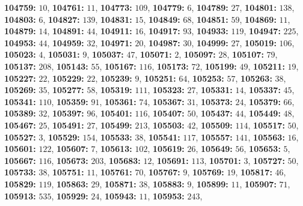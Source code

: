 \textsf{\bfseries 104759:} $10$, \textsf{\bfseries 104761:} $11$, \textsf{\bfseries 104773:} $109$, \textsf{\bfseries 104779:} $6$, \textsf{\bfseries 104789:} $27$, \textsf{\bfseries 104801:} $138$, \textsf{\bfseries 104803:} $6$, \textsf{\bfseries 104827:} $139$, \textsf{\bfseries 104831:} $15$, \textsf{\bfseries 104849:} $68$, \textsf{\bfseries 104851:} $59$, \textsf{\bfseries 104869:} $11$, \textsf{\bfseries 104879:} $14$, \textsf{\bfseries 104891:} $44$, \textsf{\bfseries 104911:} $16$, \textsf{\bfseries 104917:} $93$, \textsf{\bfseries 104933:} $119$, \textsf{\bfseries 104947:} $225$, \textsf{\bfseries 104953:} $44$, \textsf{\bfseries 104959:} $32$, \textsf{\bfseries 104971:} $20$, \textsf{\bfseries 104987:} $30$, \textsf{\bfseries 104999:} $27$, \textsf{\bfseries 105019:} $106$, \textsf{\bfseries 105023:} $4$, \textsf{\bfseries 105031:} $9$, \textsf{\bfseries 105037:} $47$, \textsf{\bfseries 105071:} $2$, \textsf{\bfseries 105097:} $28$, \textsf{\bfseries 105107:} $79$, \textsf{\bfseries 105137:} $208$, \textsf{\bfseries 105143:} $55$, \textsf{\bfseries 105167:} $116$, \textsf{\bfseries 105173:} $72$, \textsf{\bfseries 105199:} $49$, \textsf{\bfseries 105211:} $19$, \textsf{\bfseries 105227:} $22$, \textsf{\bfseries 105229:} $22$, \textsf{\bfseries 105239:} $9$, \textsf{\bfseries 105251:} $64$, \textsf{\bfseries 105253:} $57$, \textsf{\bfseries 105263:} $38$, \textsf{\bfseries 105269:} $35$, \textsf{\bfseries 105277:} $58$, \textsf{\bfseries 105319:} $111$, \textsf{\bfseries 105323:} $27$, \textsf{\bfseries 105331:} $14$, \textsf{\bfseries 105337:} $45$, \textsf{\bfseries 105341:} $110$, \textsf{\bfseries 105359:} $91$, \textsf{\bfseries 105361:} $74$, \textsf{\bfseries 105367:} $31$, \textsf{\bfseries 105373:} $24$, \textsf{\bfseries 105379:} $66$, \textsf{\bfseries 105389:} $32$, \textsf{\bfseries 105397:} $96$, \textsf{\bfseries 105401:} $116$, \textsf{\bfseries 105407:} $50$, \textsf{\bfseries 105437:} $44$, \textsf{\bfseries 105449:} $48$, \textsf{\bfseries 105467:} $25$, \textsf{\bfseries 105491:} $27$, \textsf{\bfseries 105499:} $213$, \textsf{\bfseries 105503:} $42$, \textsf{\bfseries 105509:} $114$, \textsf{\bfseries 105517:} $50$, \textsf{\bfseries 105527:} $3$, \textsf{\bfseries 105529:} $154$, \textsf{\bfseries 105533:} $38$, \textsf{\bfseries 105541:} $117$, \textsf{\bfseries 105557:} $141$, \textsf{\bfseries 105563:} $16$, \textsf{\bfseries 105601:} $122$, \textsf{\bfseries 105607:} $7$, \textsf{\bfseries 105613:} $102$, \textsf{\bfseries 105619:} $26$, \textsf{\bfseries 105649:} $56$, \textsf{\bfseries 105653:} $5$, \textsf{\bfseries 105667:} $116$, \textsf{\bfseries 105673:} $203$, \textsf{\bfseries 105683:} $12$, \textsf{\bfseries 105691:} $113$, \textsf{\bfseries 105701:} $3$, \textsf{\bfseries 105727:} $50$, \textsf{\bfseries 105733:} $38$, \textsf{\bfseries 105751:} $11$, \textsf{\bfseries 105761:} $70$, \textsf{\bfseries 105767:} $9$, \textsf{\bfseries 105769:} $19$, \textsf{\bfseries 105817:} $46$, \textsf{\bfseries 105829:} $119$, \textsf{\bfseries 105863:} $29$, \textsf{\bfseries 105871:} $38$, \textsf{\bfseries 105883:} $9$, \textsf{\bfseries 105899:} $11$, \textsf{\bfseries 105907:} $71$, \textsf{\bfseries 105913:} $535$, \textsf{\bfseries 105929:} $24$, \textsf{\bfseries 105943:} $11$, \textsf{\bfseries 105953:} $243$, 
